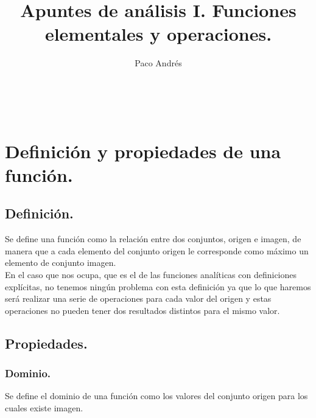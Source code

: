 \documentclass[a4paper,11pt,answers]{exam}
\def \autor{Paco Andrés}
\def \titulo{Apuntes de análisis I. Funciones elementales y operaciones.}
\begin{document}
\newcommand{\e}{\mathrm{e}}
\newcommand{\asen}{\mathrm{asen\,}}
\newcommand{\acos}{\mathrm{acos\,}}
\newcommand{\atg}{\mathrm{atg\,}}

\title{\titulo}
\date{}
\author{\autor}
\maketitle

\begin{center}
\doclicenseLongText\\
\vspace{.25cm}
\doclicenseImage
\end{center}

\section{Definición y propiedades de una función.}
\subsection{Definición.}
Se define una función como la relación entre dos conjuntos, origen e imagen, de manera que a cada elemento del conjunto origen le corresponde como máximo un elemento de conjunto imagen.\\

En el caso que nos ocupa, que es el de las funciones analíticas con definiciones explícitas, no tenemos ningún problema con esta definición ya que lo que haremos será realizar una serie de operaciones para cada valor del origen y estas operaciones no pueden tener dos resultados distintos para el mismo valor.

\subsection{Propiedades.}
\subsubsection{Dominio.}
Se define el dominio de una función como los valores del conjunto origen para los cuales existe imagen.\\
\end{document}
